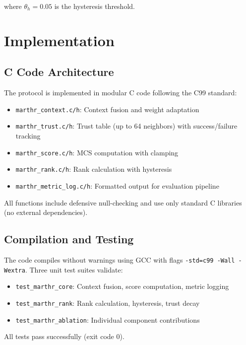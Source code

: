 \documentclass[conference]{IEEEtran}
\begin{document}
where $\theta_h = 0.05$ is the hysteresis threshold.

\section{Implementation}

\subsection{C Code Architecture}

The protocol is implemented in modular C code following the C99 standard:

\begin{itemize}
\item \texttt{marthr\_context.c/h}: Context fusion and weight adaptation
\item \texttt{marthr\_trust.c/h}: Trust table (up to 64 neighbors) with success/failure tracking
\item \texttt{marthr\_score.c/h}: MCS computation with clamping
\item \texttt{marthr\_rank.c/h}: Rank calculation with hysteresis
\item \texttt{marthr\_metric\_log.c/h}: Formatted output for evaluation pipeline
\end{itemize}

All functions include defensive null-checking and use only standard C libraries (no external dependencies).

\subsection{Compilation and Testing}

The code compiles without warnings using GCC with flags \texttt{-std=c99 -Wall -Wextra}. Three unit test suites validate:
\begin{itemize}
\item \texttt{test\_marthr\_core}: Context fusion, score computation, metric logging
\item \texttt{test\_marthr\_rank}: Rank calculation, hysteresis, trust decay
\item \texttt{test\_marthr\_ablation}: Individual component contributions
\end{itemize}

All tests pass successfully (exit code 0).
\end{document}
